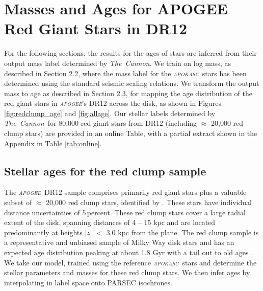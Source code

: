 \documentclass[12pt, preprint]{aastex}
\newcommand{\project}[1]{\textsl{#1}}
\newcommand{\tc}{\project{The~Cannon}}
\newcommand{\apogee}{\project{\textsc{apogee}}}
\newcommand{\apokasc}{\project{\textsc{apokasc}}}
\newcommand{\teff}{\mbox{$\rm T_{eff}$}}
\newcommand{\feh}{\mbox{$\rm [Fe/H]$}}
\newcommand{\alphafe}{\mbox{$\rm [\alpha/Fe]$}}
\newcommand{\logg}{\mbox{$\rm \log g$}}
\begin{document}
\section{Masses and Ages for APOGEE Red Giant Stars in DR12} 

For the following sections, the results for the ages of stars are inferred from their output mass label determined by \tc. We train on log mass, as described in Section 2.2, where the mass label for the \apokasc\ stars has been determined using the standard seismic scaling relations. We transform the output mass to age as described in Section 2.3, for mapping the age distribution of the red giant stars in \apogee's DR12 across the disk, as shown in Figures \ref{fig:redclump_age} and \ref{fig:allage}. Our stellar labels determined by \tc\ for 80,000 red giant stars from DR12  (including $\approx$ 20,000 red clump stars) are provided in an online Table, with a partial extract shown in the Appendix in Table \ref{tab:online}. 








\subsection{Stellar ages for the red clump sample}

The \apogee\ DR12 sample comprises primarily red giant stars plus a valuable subset of  $\approx$ 20,000 red clump stars, identified by \citet{Bovy2014}.  These stars have individual distance uncertainties of 5\,percent. These red clump stars cover a large radial extent of the disk, spanning distances of 4 -- 15 kpc and are located predominantly at heights $|z|$ $<$ 3.0 kpc from the plane. The red clump sample is a representative and unbiased sample of Milky Way disk stars and has an expected age distribution peaking at about 1.8 Gyr with a tail out to old ages \citep[see Figure 15 of][]{Bovy2014}. We take our model, trained using the reference \apokasc\ stars and determine the stellar parameters and masses for these red clump stars. We then infer ages by interpolating in label space onto PARSEC isochrones.
\end{document}
